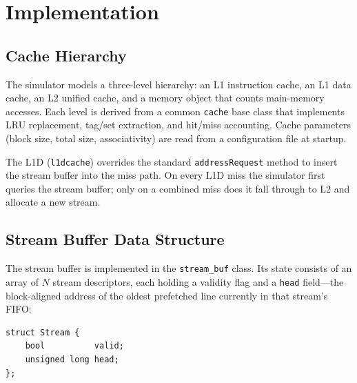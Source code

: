 \documentclass[11pt,letterpaper]{article}
\begin{document}

\section{Implementation}

\subsection{Cache Hierarchy}

The simulator models a three-level hierarchy: an L1 instruction cache, an L1
data cache, an L2 unified cache, and a memory object that counts main-memory
accesses. Each level is derived from a common \texttt{cache} base class that
implements LRU replacement, tag/set extraction, and hit/miss accounting. Cache
parameters (block size, total size, associativity) are read from a
configuration file at startup.

The L1D (\texttt{l1dcache}) overrides the standard \texttt{addressRequest}
method to insert the stream buffer into the miss path. On every L1D miss the
simulator first queries the stream buffer; only on a combined miss does it fall
through to L2 and allocate a new stream.

\subsection{Stream Buffer Data Structure}

The stream buffer is implemented in the \texttt{stream\_buf} class. Its state
consists of an array of \(N\) stream descriptors, each holding a validity flag
and a \texttt{head} field---the block-aligned address of the oldest prefetched
line currently in that stream's FIFO:

\begin{verbatim}
struct Stream {
    bool          valid;
    unsigned long head;
};
\end{verbatim}
\end{document}
